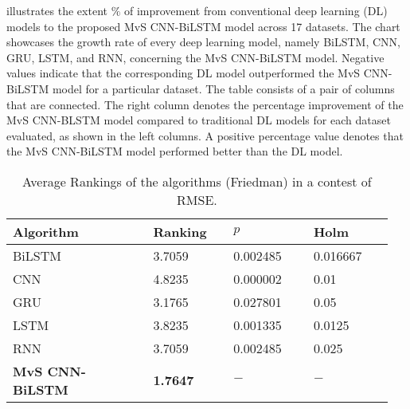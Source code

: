    illustrates the extent $\%$ of improvement from conventional deep learning (DL) models to the proposed MvS CNN-BiLSTM model across 17 datasets. The chart showcases the growth rate of every deep learning model,  namely BiLSTM,  CNN,  GRU,  LSTM,  and RNN, concerning the MvS CNN-BiLSTM model. Negative values indicate that the corresponding DL model outperformed the MvS CNN-BiLSTM model for a particular dataset. The table consists of a pair of columns that are connected. The right column denotes the percentage improvement of the MvS CNN-BLSTM model compared to traditional DL models for each dataset evaluated, as shown in the left columns.  A positive percentage value denotes that the MvS CNN-BiLSTM model performed better than the DL model.





  \begin{table}[H]
    \setlength{\tabcolsep}{3pt}
    {\renewcommand{\arraystretch}{1}%
    \begin{longtable}[c]{ p{0.35\linewidth} p{0.20\linewidth} p{0.20\linewidth} p{0.20\linewidth}  }
      \caption{Average Rankings of the algorithms (Friedman) in a contest of RMSE.}
      \label{rank_rmse}
    \\ \hline
    Algorithm&Ranking&$p$&Holm
    \\ \hline
    \endhead
    BiLSTM&3.7059&0.002485&0.016667\\
    CNN&4.8235&0.000002&0.01\\
    GRU&3.1765&0.027801&0.05\\
    LSTM&3.8235&0.001335&0.0125\\
    RNN&3.7059&0.002485&0.025\\
    \textbf{MvS CNN-BiLSTM}&\textbf{1.7647}&$-$ &$-$ \\\hline
    \end{longtable}}
    \end{table}






